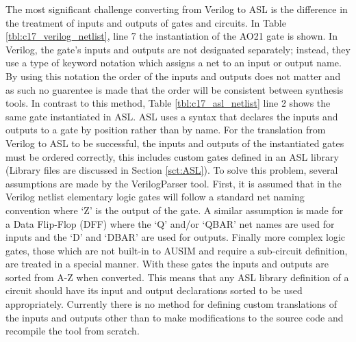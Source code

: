 \documentclass[12pt]{report}
\begin{document}
The most significant challenge converting from Verilog to ASL is the difference in the treatment of inputs and outputs of gates and circuits.  In Table \ref{tbl:c17_verilog_netlist}, line 7 the instantiation of the AO21 gate is shown.  In Verilog, the gate's inputs and outputs are not designated separately; instead, they use a type of keyword notation which assigns a net to an input or output name.  By using this notation the order of the inputs and outputs does not matter and as such no guarentee is made that the order will be consistent between synthesis tools.  In contrast to this method, Table \ref{tbl:c17_asl_netlist} line 2 shows the same gate instantiated in ASL.  ASL uses a syntax that declares the inputs and outputs to a gate by position rather than by name.  For the translation from Verilog to ASL to be successful, the inputs and outputs of the instantiated gates must be ordered correctly, this includes custom gates defined in an ASL library (Library files are discussed in Section \ref{sct:ASL}).   To solve this problem, several assumptions are made by the VerilogParser tool.  First, it is assumed that in the Verilog netlist elementary logic gates will follow a standard net naming convention where `Z' is the output of the gate.  A similar assumption is made for a Data Flip-Flop (DFF) where the `Q' and/or `QBAR' net names are used for inputs and the `D' and `DBAR' are used for outputs.  Finally more complex logic gates, those which are not built-in to AUSIM and require a sub-circuit definition, are treated in a special manner.  With these gates the inputs and outputs are sorted from A-Z when converted.  This means that any ASL library definition of a circuit should have its input and output declarations sorted to be used appropriately.  Currently there is no method for defining custom translations of the inputs and outputs other than to make modifications to the source code and recompile the tool from scratch.
\end{document}
